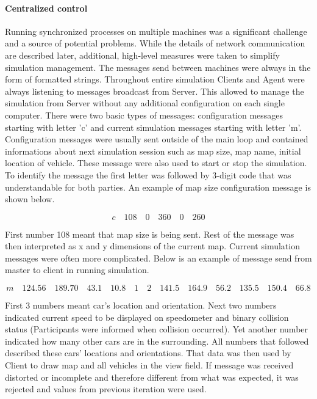 \documentclass[11pt,english]{article}
\begin{document}
\paragraph{Centralized control}


Running synchronized processes on multiple machines was a significant challenge and a source of potential problems. While the details of network communication are described later, additional, high-level measures were taken to simplify simulation management. The messages send between machines were always in the form of formatted strings. Throughout entire simulation Clients and Agent were always listening to messages broadcast from Server. This allowed to manage the simulation from Server without any additional configuration on each single computer. There were two basic types of messages: configuration messages starting with letter 'c' and current simulation messages starting with letter 'm'.
Configuration messages were usually sent outside of the main loop and contained informations about next simulation session such as map size, map name, initial location of vehicle. These message were also used to start or stop the simulation. To identify the message the first letter was followed by 3-digit code that was understandable for both parties. An example of map size configuration message is shown below.

\begin{equation}
c \quad 108 \quad 0 \quad 360 \quad 0 \quad 260
\end{equation}

First number 108 meant that map size is being sent. Rest of the message was then interpreted as x and y dimensions of the current map.
Current simulation messages were often more complicated. Below is an example of message send from master to client in running simulation. 
 
\begin{equation}
m \quad 124.56 \quad 189.70 \quad 43.1 \quad 10.8 \quad 1 \quad 2 \quad 141.5 \quad 164.9  \quad 56.2 \quad 135.5 \quad 150.4  \quad 66.8
\end{equation}

First 3 numbers meant car's location and orientation. Next two numbers indicated current speed to be displayed on speedometer and binary collision status (Participants were informed when collision occurred). Yet another number indicated how many other cars are in the surrounding. All numbers that followed described these cars' locations and orientations. That data was then used by Client to draw map and all vehicles in the view field. If message was received distorted or incomplete and therefore different from what was expected, it was rejected and values from previous iteration were used.
\end{document}
